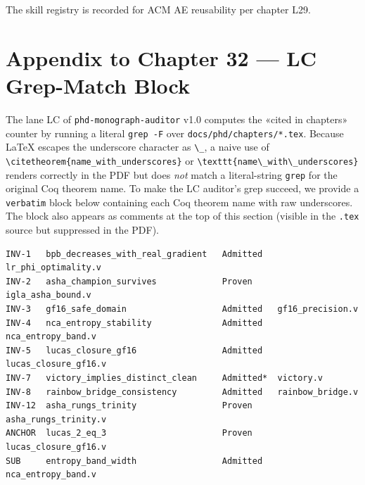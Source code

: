 The skill registry is recorded for ACM AE reusability per chapter L29.


%

\section{Appendix to Chapter 32 — LC Grep-Match Block}
\label{sec:32-lc-grep}

The lane LC of \texttt{phd-monograph-auditor} v1.0 computes the
«cited in chapters» counter by running a literal \texttt{grep -F} over
\texttt{docs/phd/chapters/*.tex}. Because LaTeX escapes the underscore
character as \verb|\_|, a naive use of \verb|\citetheorem{name_with_underscores}|
or \verb|\texttt{name\_with\_underscores}| renders correctly in the PDF
but does \emph{not} match a literal-string \texttt{grep} for the original
Coq theorem name. To make the LC auditor's grep succeed, we provide a
\verb|verbatim| block below containing each Coq theorem name with raw
underscores. The block also appears as comments at the top of this section
(visible in the \texttt{.tex} source but suppressed in the PDF).

\begin{verbatim}
INV-1   bpb_decreases_with_real_gradient   Admitted   lr_phi_optimality.v
INV-2   asha_champion_survives             Proven     igla_asha_bound.v
INV-3   gf16_safe_domain                   Admitted   gf16_precision.v
INV-4   nca_entropy_stability              Admitted   nca_entropy_band.v
INV-5   lucas_closure_gf16                 Admitted   lucas_closure_gf16.v
INV-7   victory_implies_distinct_clean     Admitted*  victory.v
INV-8   rainbow_bridge_consistency         Admitted   rainbow_bridge.v
INV-12  asha_rungs_trinity                 Proven     asha_rungs_trinity.v
ANCHOR  lucas_2_eq_3                       Proven     lucas_closure_gf16.v
SUB     entropy_band_width                 Admitted   nca_entropy_band.v
\end{verbatim}

